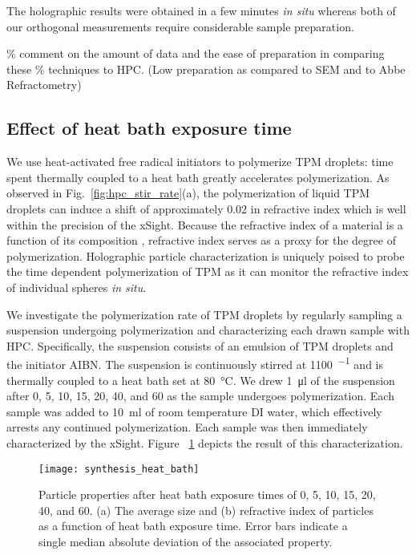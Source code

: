 The holographic results were obtained in a few minutes \emph{in situ} whereas both of
our orthogonal measurements require considerable sample preparation. 

\% comment on the amount of data and the ease of preparation in comparing these
\% techniques to HPC. (Low preparation as compared to SEM and to Abbe Refractometry)

\subsection{Effect of heat bath exposure time}

We use heat-activated free radical initiators to polymerize TPM droplets:
time spent thermally coupled to a heat bath greatly accelerates polymerization. 
As observed in Fig.~\ref{fig:hpc_stir_rate}(a), the polymerization of
liquid TPM droplets can induce a shift of approximately \SI{0.02}{} in refractive index
which is well within the precision of the xSight.  Because the refractive index
of a material is a function of its composition \cite{wang15},
refractive index serves as a proxy for the degree of polymerization.
Holographic particle characterization is uniquely poised to probe the time dependent
polymerization of TPM as it can monitor the refractive index of individual spheres
\emph{in situ}.

We investigate the polymerization rate of TPM droplets by regularly sampling a
suspension undergoing polymerization and characterizing each drawn sample with HPC.
Specifically, the suspension consists of an emulsion of TPM droplets
and the initiator AIBN. The suspension is continuously stirred at \SI{1100}{\min^{-1}}
and is thermally coupled to a heat bath set at \SI{80}{\degreeCelsius}.
We drew \SI{1}{\ul} of the suspension after \num{0}, \num{5}, \num{10}, \num{15},
\num{20}, \num{40}, and \SI{60}{\min} as the sample undergoes polymerization.
Each sample was added to \SI{10}{\ml} of room temperature DI water, which effectively
arrests any continued polymerization. 
Each sample was then immediately characterized by the xSight. Figure ~\ref{fig:heat_size_time}
depicts the result of this characterization.

\begin{figure}
    \centering
    \texttt{[image: synthesis\_heat\_bath]}
    \caption{Particle properties after heat bath exposure times of \num{0}, \num{5},
      \num{10}, \num{15}, \num{20}, \num{40}, and \SI{60}{\min}.
      (a) The average size and (b) refractive index of particles as a function
      of heat bath exposure time. Error bars indicate a single median absolute deviation
      of the associated property.}
    \label{fig:heat_size_time}
\end{figure}

